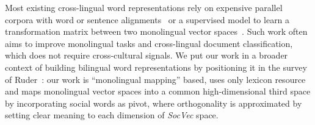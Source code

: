 Most existing cross-lingual word representations  
rely on expensive parallel corpora with word or sentence 
alignments~\cite{klementiev2012inducing,kovcisky2014learning} or  a 
supervised model to learn a transformation matrix between two monolingual 
vector spaces~\cite{Mikolov:2013tp}. 
Such work often aims to improve monolingual tasks and cross-lingual 
document classification, which does not require cross-cultural signals. 
We put our work in a broader context of building bilingual word representations by positioning it in the survey of Ruder~: 
our work is ``monolingual mapping'' based, uses only lexicon resource and 
maps monolingual vector spaces into a common high-dimensional third space 
by incorporating social words as pivot, where orthogonality is 
approximated by setting clear meaning to each dimension 
of \textit{SocVec} space.

